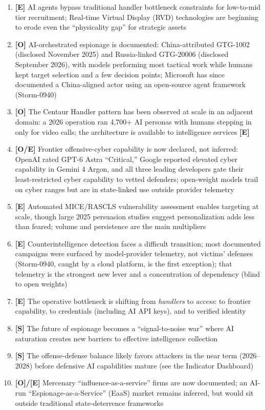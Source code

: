 \documentclass[11pt,letterpaper]{article}
\begin{document}
\begin{keybox}
\begin{enumerate}
  \item \textbf{[E]} AI agents bypass traditional handler bottleneck constraints for low-to-mid tier recruitment; Real-time Virtual Display (RVD) technologies are beginning to erode even the ``physicality gap'' for strategic assets
  \item \textbf{[O]} AI-orchestrated espionage is documented: China-attributed GTG-1002 (disclosed November 2025) and Russia-linked GTG-20006 (disclosed September 2026), with models performing most tactical work while humans kept target selection and a few decision points; Microsoft has since documented a China-aligned actor using an open-source agent framework (Storm-0940)
  \item \textbf{[O]} The Centaur Handler pattern has been observed at scale in an adjacent domain: a 2026 operation ran 4,700+ AI personas with humans stepping in only for video calls; the architecture is available to intelligence services \textbf{[E]}
  \item \textbf{[O/E]} Frontier offensive-cyber capability is now declared, not inferred: OpenAI rated GPT-6 Astra ``Critical,'' Google reported elevated cyber capability in Gemini 4 Argon, and all three leading developers gate their least-restricted cyber capability to vetted defenders; open-weight models trail on cyber ranges but are in state-linked use outside provider telemetry
  \item \textbf{[E]} Automated MICE/RASCLS vulnerability assessment enables targeting at scale, though large 2025 persuasion studies suggest personalization adds less than feared; volume and persistence are the main multipliers
  \item \textbf{[E]} Counterintelligence detection faces a difficult transition; most documented campaigns were surfaced by model-provider telemetry, not victims' defenses (Storm-0940, caught by a cloud platform, is the first exception); that telemetry is the strongest new lever and a concentration of dependency (blind to open weights)
  \item \textbf{[E]} The operative bottleneck is shifting from \textit{handlers} to \textit{access}: to frontier capability, to credentials (including AI API keys), and to verified identity
  \item \textbf{[S]} The future of espionage becomes a ``signal-to-noise war'' where AI saturation creates new barriers to effective intelligence collection
  \item \textbf{[S]} The offense-defense balance likely favors attackers in the near term (2026--2028) before defensive AI capabilities mature (see the Indicator Dashboard)
  \item \textbf{[O]/[E]} Mercenary ``influence-as-a-service'' firms are now documented; an AI-run ``Espionage-as-a-Service'' (EaaS) market remains inferred, but would sit outside traditional state-deterrence frameworks
\end{enumerate}
\end{keybox}
\end{document}
